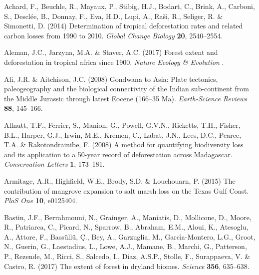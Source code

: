 \documentclass[a4paper, 12pt, leqno]{article}\usepackage[]{graphicx}\usepackage[]{color}
\begin{document}
\begin{thebibliography}{60}
\providecommand{\natexlab}[1]{#1}

Achard, F., Beuchle, R., Mayaux, P., Stibig, H.J., Bodart, C., Brink, A.,
  Carboni, S., Desclée, B., Donnay, F., Eva, H.D., Lupi, A., Raši, R.,
  Seliger, R. \& Simonetti, D. (2014) Determination of tropical deforestation
  rates and related carbon losses from 1990 to 2010. \emph{Global Change
  Biology} \textbf{20}, 2540--2554.

Aleman, J.C., Jarzyna, M.A. \& Staver, A.C. (2017) Forest extent and
  deforestation in tropical africa since 1900. \emph{Nature Ecology \&
  Evolution} .

Ali, J.R. \& Aitchison, J.C. (2008) {Gondwana to Asia: Plate tectonics,
  paleogeography and the biological connectivity of the Indian sub-continent
  from the Middle Jurassic through latest Eocene (166--35 Ma)}.
  \emph{Earth-Science Reviews} \textbf{88}, 145--166.

Allnutt, T.F., Ferrier, S., Manion, G., Powell, G.V.N., Ricketts, T.H., Fisher,
  B.L., Harper, G.J., Irwin, M.E., Kremen, C., Labat, J.N., Lees, D.C., Pearce,
  T.A. \& Rakotondrainibe, F. (2008) {A method for quantifying biodiversity
  loss and its application to a 50-year record of deforestation across
  Madagascar}. \emph{Conservation Letters} \textbf{1}, 173--181.

Armitage, A.R., Highfield, W.E., Brody, S.D. \& Louchouarn, P. (2015) {The
  contribution of mangrove expansion to salt marsh loss on the Texas Gulf
  Coast}. \emph{PloS One} \textbf{10}, e0125404.

Bastin, J.F., Berrahmouni, N., Grainger, A., Maniatis, D., Mollicone, D.,
  Moore, R., Patriarca, C., Picard, N., Sparrow, B., Abraham, E.M., Aloui, K.,
  Atesoglu, A., Attore, F., Bass{\"u}ll{\"u}, {\c C}., Bey, A., Garzuglia, M.,
  Garc{\'\i}a-Montero, L.G., Groot, N., Guerin, G., Laestadius, L., Lowe, A.J.,
  Mamane, B., Marchi, G., Patterson, P., Rezende, M., Ricci, S., Salcedo, I.,
  Diaz, A.S.P., Stolle, F., Surappaeva, V. \& Castro, R. (2017) The extent of
  forest in dryland biomes. \emph{Science} \textbf{356}, 635--638.


\end{thebibliography}
\end{document}
